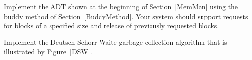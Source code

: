 \begin{projects}
\item
Implement the  ADT shown at the beginning of
Section~\ref{MemMan}
using the buddy method of
Section~\ref{BuddyMethod}.
Your system should support requests for blocks of a specified size
and release of previously requested blocks.

\item
Implement the Deutsch-Schorr-Waite garbage collection algorithm
that is illustrated by
Figure~\ref{DSW}.

\end{projects}
